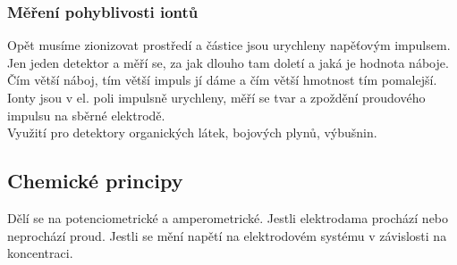 \subsubsection*{Měření pohyblivosti iontů}
Opět musíme zionizovat prostředí a částice jsou urychleny napěťovým impulsem.\\
Jen jeden detektor a měří se, za jak dlouho tam doletí a jaká je hodnota náboje.\\
Čím větší náboj, tím větší impuls jí dáme a čím větší hmotnost tím pomalejší.\\
Ionty jsou v el. poli impulsně urychleny, měří se tvar a zpoždění proudového impulsu na sběrné elektrodě.\\
Využití pro detektory organických látek, bojových plynů, výbušnin.\\

\subsection{Chemické principy}
Dělí se na potenciometrické a amperometrické. Jestli elektrodama prochází nebo neprochází proud. Jestli se mění napětí na elektrodovém systému v závislosti na koncentraci.\\

